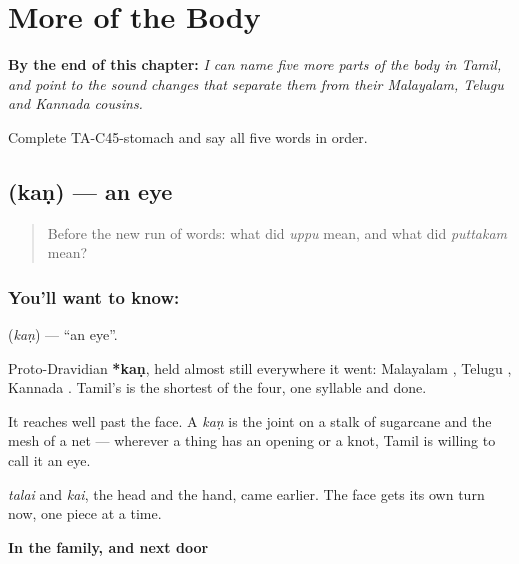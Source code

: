 
\chapter{More of the Body}
\label{ch:ta-body-more}

\begin{chapteropening}
\textbf{By the end of this chapter:} \emph{I can name five more parts of the body in Tamil, and point to the sound changes that separate them from their Malayalam, Telugu and Kannada cousins.}

Complete TA-C45-stomach and say all five words in order.
\end{chapteropening}

\section[\texorpdfstring{\ta{கண்} (kaṇ)}{கண் (kaṇ)}]{ (kaṇ) — an eye}

\label{lesson:TA-C45-eye}



\begin{quote}
Before the new run of words: what did \emph{uppu} mean, and what did \emph{puttakam} mean?
\end{quote}

\subsection*{You'll want to know: }
\textbf{} (\emph{kaṇ}) — \textquotedblleft{}an eye\textquotedblright{}.

Proto-Dravidian \textbf{*kaṇ}, held almost still everywhere it went: Malayalam , Telugu , Kannada . Tamil's is the shortest of the four, one syllable and done.

It reaches well past the face. A \emph{kaṇ} is the joint on a stalk of sugarcane and the mesh of a net — wherever a thing has an opening or a knot, Tamil is willing to call it an eye.

\emph{talai} and \emph{kai}, the head and the hand, came earlier. The face gets its own turn now, one piece at a time.

\textbf{In the family, and next door}

